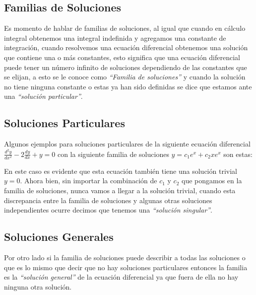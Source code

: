 \documentclass[12pt, letterpaper]{article}
\begin{document}
        \subsection{Familias de Soluciones}
            \noindent
                Es momento de hablar de familias de soluciones, al igual que cuando en cálculo integral obtenemos una integral indefinida y agregamos una constante de integración, cuando resolvemos una ecuación diferencial obtenemos una solución que contiene una o más constantes, esto significa que una ecuación diferencial puede tener un número infinito de soluciones dependiendo de las constantes que se elijan, a esto se le conoce como \emph{``Familia de soluciones''} y cuando la solución no tiene ninguna constante o estas ya han sido definidas se dice que estamos ante una \emph{``solución particular''}.
        \subsection{Soluciones Particulares}
            \noindent
                Algunos ejemplos para soluciones particulares de la siguiente ecuación diferencial $\frac{d^2y}{dx^2}-2\frac{dy}{dx}+y=0$ con la siguiente familia de soluciones $y=c_1e^x+c_2xe^x$ son estas:
            \par 
                En este caso es evidente que esta ecuación también tiene una solución trivial $y=0$. Ahora bien, sin importar la combinación  de $c_1$ y $c_2$ que pongamos en la familia de soluciones, nunca vamos a llegar a la solución trivial, cuando esta discrepancia entre la familia de soluciones y algunas otras soluciones independientes ocurre decimos que tenemos una \emph{``solución singular''}.
        \subsection{Soluciones Generales}
            \noindent
                Por otro lado si la familia de soluciones puede describir a todas las soluciones o que es lo mismo que decir que no hay soluciones particulares entonces la familia es la \emph{``solución general''} de la ecuación diferencial ya que fuera de ella no hay ninguna otra solución.
\end{document}
